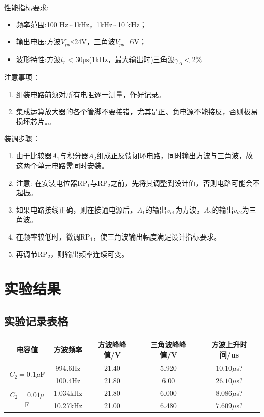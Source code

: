 \documentclass[a4paper,11pt,UTF8]{article}
\numberwithin{equation}{subsection}
\begin{document}
\noindent 性能指标要求:
\begin{itemize}
	\item 频率范围:100 Hz$\sim$1kHz，1kHz$\sim$10 kHz；
	\item 输出电压:方波$V_{pp}$≤24V，三角波$V_{pp}$=6V；
	\item 波形特性:方波$t_r<30\mathrm{\mu s}$(1kHz，最大输出时)三角波$\gamma_\Delta<2\%$
\end{itemize}
注意事项：
\begin{enumerate}
	\item 组装电路前须对所有电阻逐一测量，作好记录。 
	\item 集成运算放大器的各个管脚不要接错，尤其是正、负电源不能接反，否则极易损坏芯片。。
\end{enumerate}
装调步骤：
\begin{enumerate}
	\item 由于比较器$A_1$与积分器$A_2$组成正反馈闭环电路，同时输出方波与三角波，故这两个单元电路需同时安装。
	\item 注意: 在安装电位器RP$_1$与RP$_2$之前，先将其调整到设计值，否则电路可能会不起振。
	\item 如果电路接线正确，则在接通电源后，$A_1$的输出$v_{o1}$为方波，$A_2$的输出$v_{o2}$为三角波。
	\item 在频率较低时，微调RP$_1$，使三角波输出幅度满足设计指标要求。
	\item 再调节RP$_2$，则输出频率连续可变。
	
\end{enumerate}


\section{实验结果}
\subsection{实验记录表格}
\begin{table}[H]
	\centering
	\begin{tabular}{|c|c|c|c|c|}
		\hline
		电容值&方波频率&方波峰峰值/V&	三角波峰峰值/V	&方波上升时间/us\\
		\hline
		\multirow{2}{*}{$C_2=0.1\mu$F} & 994.6Hz & 21.40 & 5.920 & $10.10\mu$s?\\
		\cline{2-5}
		& 100.4Hz & 21.80 & 6.00 & $26.10\mu$s?\\
		\hline
		\multirow{2}{*}{$C_2=0.01\mu$F} & 1.034kHz & 21.80 &  6.000 & $8.086\mu$s?\\
		\cline{2-5}
		& 10.27kHz & 21.00 &  6.480 & $7.609\mu$s?\\
		\hline
	\end{tabular}
\end{table}
\end{document}
